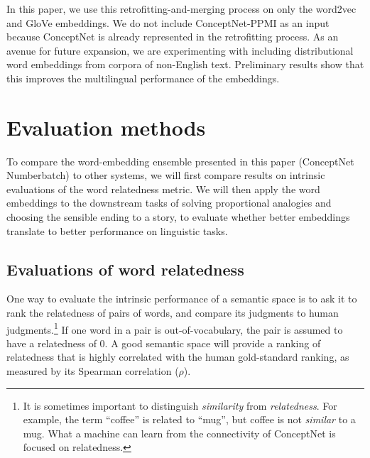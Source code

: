 \documentclass[letterpaper]{article}
\begin{document}

In this paper, we use this retrofitting-and-merging process on only the
word2vec and GloVe embeddings. We do not include ConceptNet-PPMI as an input
because ConceptNet is already represented in the retrofitting process. As an
avenue for future expansion, we are experimenting with including distributional
word embeddings from corpora of non-English text. Preliminary results show that
this improves the multilingual performance of the embeddings.

\section{Evaluation methods}

To compare the word-embedding ensemble presented in this paper (ConceptNet
Numberbatch) to other systems, we will first compare results on intrinsic
evaluations of the word relatedness metric. We will then apply the word
embeddings to the downstream tasks of solving proportional analogies and
choosing the sensible ending to a story, to evaluate whether better embeddings
translate to better performance on linguistic tasks.

\subsection{Evaluations of word relatedness}
\label{intrinsic-evaluations}

One way to evaluate the intrinsic performance of a semantic space is to ask it
to rank the relatedness of pairs of words, and compare its judgments to human
judgments.\footnote{It is sometimes important to distinguish \emph{similarity}
from \emph{relatedness}. For example, the term ``coffee'' is related to
``mug'', but coffee is not \emph{similar} to a mug. What a machine can learn
from the connectivity of ConceptNet is focused on relatedness.} If one word in
a pair is out-of-vocabulary, the pair is assumed to have a relatedness of 0. A
good semantic space will provide a ranking of relatedness that is highly
correlated with the human gold-standard ranking, as measured by its Spearman
correlation ($\rho$).
\end{document}

